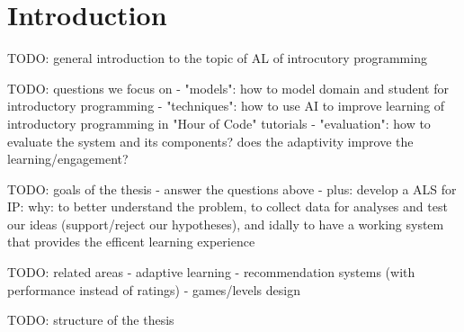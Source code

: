 \chapter{Introduction}
\label{chap:introduction}

TODO: general introduction to the topic of AL of introcutory programming

TODO: questions we focus on
- "models": how to model domain and student for introductory programming
- "techniques": how to use AI to improve learning of introductory programming
  in "Hour of Code" tutorials
- "evaluation": how to evaluate the system and its components?
  does the adaptivity improve the learning/engagement?

TODO: goals of the thesis
- answer the questions above
- plus: develop a ALS for IP: why: to better understand the problem,
  to collect data for analyses and test our ideas (support/reject our hypotheses),
  and idally to have a working system that provides the efficent learning experience


TODO: related areas
- adaptive learning
- recommendation systems (with performance instead of ratings)
- games/levels design


TODO: structure of the thesis
